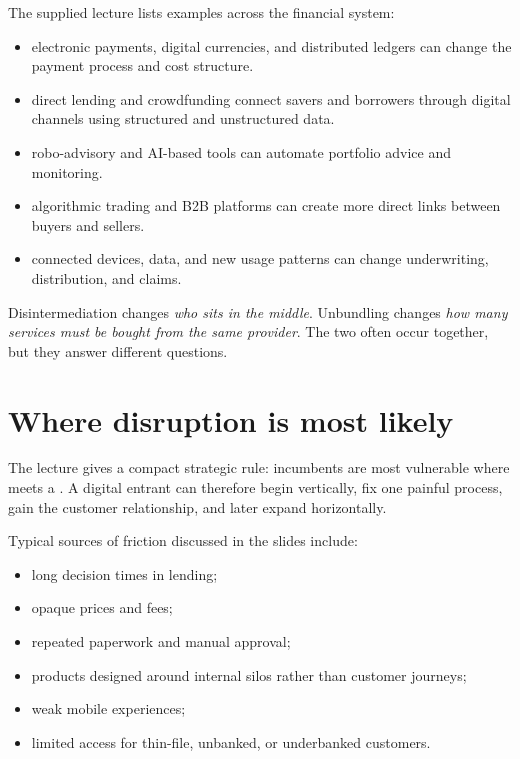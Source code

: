 The supplied lecture lists examples across the financial system:

\begin{itemize}
  \item {} electronic payments, digital currencies, and distributed ledgers can change the payment process and cost structure.
  \item {} direct lending and crowdfunding connect savers and borrowers through digital channels using structured and unstructured data.
  \item {} robo-advisory and AI-based tools can automate portfolio advice and monitoring.
  \item {} algorithmic trading and B2B platforms can create more direct links between buyers and sellers.
  \item {} connected devices, data, and new usage patterns can change underwriting, distribution, and claims.
\end{itemize}

\begin{keyidea}
Disintermediation changes \emph{who sits in the middle}. Unbundling changes \emph{how many services must be bought from the same provider}. The two often occur together, but they answer different questions.
\end{keyidea}

\section{Where disruption is most likely}

The lecture gives a compact strategic rule: incumbents are most vulnerable where  meets a . A digital entrant can therefore begin vertically, fix one painful process, gain the customer relationship, and later expand horizontally.

Typical sources of friction discussed in the slides include:

\begin{itemize}
  \item long decision times in lending;
  \item opaque prices and fees;
  \item repeated paperwork and manual approval;
  \item products designed around internal silos rather than customer journeys;
  \item weak mobile experiences;
  \item limited access for thin-file, unbanked, or underbanked customers.
\end{itemize}

